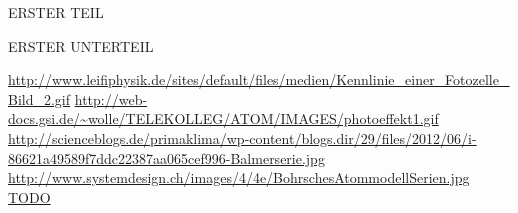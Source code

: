 \documentclass[pdftex, a4paper,11pt, twoside, ngerman]{report}
\begin{document}
  \begin{appendix}
    \label{Anhang}
    
    
    
    \begin{chapter}{ERSTER TEIL}
      \label{Anhang:chp:ERSTERTEIL}
      
      
      
      \begin{section}{ERSTER UNTERTEIL}
        \label{Anhang:chp:ERSTERTEIL:sec:UNTERTEIL}
       
       
       
      \end{section}
      
      
    \end{chapter}
    
  \end{appendix}
  
  
  
  \begin{thebibliography}{99}
    \scriptsize
    \url{http://www.leifiphysik.de/sites/default/files/medien/Kennlinie_einer_Fotozelle_Bild_2.gif}
    \url{http://web-docs.gsi.de/~wolle/TELEKOLLEG/ATOM/IMAGES/photoeffekt1.gif}
    \url{http://scienceblogs.de/primaklima/wp-content/blogs.dir/29/files/2012/06/i-86621a49589f7ddc22387aa065cef996-Balmerserie.jpg}
    \url{http://www.systemdesign.ch/images/4/4e/BohrschesAtommodellSerien.jpg}
     \url{TODO}
    
  \end{thebibliography}
  
\end{document}
